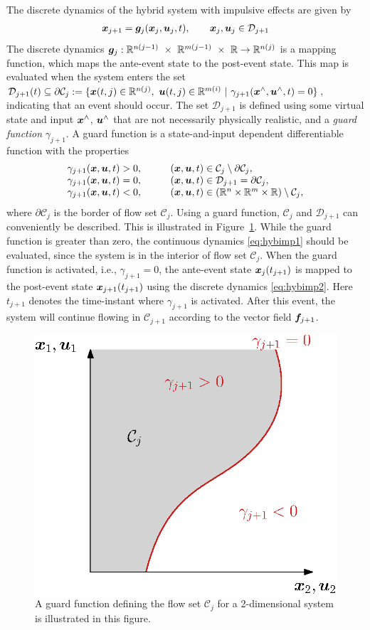 \documentclass[../DC2017114Bouma.tex]{subfiles}
\begin{document}
The discrete dynamics of the hybrid system with impulsive effects are given by
\begin{align}
{\boldsymbol{x}}_{j+1} = {\boldsymbol{g}}_j({\boldsymbol{x}}_j,{\boldsymbol{u}}_j,t), \qquad{\boldsymbol{x}}_j,{\boldsymbol{u}}_j\in \mathcal{D}_{j+1}\label{eq:hybimp2}
\end{align}
The discrete dynamics $\gb_j:\Rbb^{n(j-1)}\ \times\ \Rbb^{m(j-1)}\ \times\ \Rbb\rightarrow \Rbb^{n(j)}$ is a mapping function, which maps the ante-event state to the post-event state. This map is evaluated when the system enters the set $\mathcal{D}_{j+1}(t) \subseteq \partial \mathcal{C}_j := \{\xb(t,j)\in\Rbb^{n(j)},\ \ub(t,j)\in\Rbb^{m(i)}\ |\ \gamma_{j+1}(\xb^{\wedge},\ub^{\wedge},t) = 0\}$, indicating that an event should occur.  The set $\mathcal{D}_{j+1}$ is defined using some virtual state and input ${\boldsymbol{x}}^{\wedge}$, ${\boldsymbol{u}}^{\wedge}$ that are not necessarily physically realistic, and a \textit{guard function} $\gamma_{j+1}$. A guard function is a state-and-input dependent differentiable function with the properties
\begin{equation}
\begin{array}{llll}
\gamma_{j+1}({\boldsymbol{x}},{\boldsymbol{u}},t) > 0, & &	&({\boldsymbol{x}},{\boldsymbol{u}},t) \in \mathcal{C}_j\setminus\partial \mathcal{C}_j,\\
\gamma_{j+1}({\boldsymbol{x}},{\boldsymbol{u}},t) = 0, & &	&({\boldsymbol{x}},{\boldsymbol{u}},t) \in \mathcal{D}_{j+1} = \partial \mathcal{C}_j,\\
\gamma_{j+1}({\boldsymbol{x}},{\boldsymbol{u}},t) < 0, & &	&({\boldsymbol{x}},{\boldsymbol{u}},t) \in (\mathbb{R}^n \times \mathbb{R}^m \times \mathbb{R})\setminus \mathcal{C}_j,
\end{array}
\end{equation}
where $\partial \mathcal{C}_j$ is the border of flow set $\mathcal{C}_j$. Using a guard function, $\mathcal{C}_j$ and $\mathcal{D}_{j+1}$ can conveniently be described. This is illustrated in Figure~\ref{fig:2guards}. While the guard function is greater than zero, the continuous dynamics \eqref{eq:hybimp1} should be evaluated, since the system is in the interior of flow set $\mathcal{C}_j$. When the guard function is activated, i.e., $\gamma_{j+1} = 0$, the ante-event state ${\boldsymbol{x}}_j(t_{j+1})$ is mapped to the post-event state ${\boldsymbol{x}}_{j+1}(t_{j+1})$ using the discrete dynamics \eqref{eq:hybimp2}. Here $t_{j+1}$ denotes the time-instant where $\gamma_{j+1}$ is activated. After this event, the system will continue flowing in $\mathcal{C}_{j+1}$ according to the vector field ${\boldsymbol{f}}_{j+1}$.

\begin{figure}[h]
\centering
\includegraphics[width=.5\textwidth]{guards.eps}\caption{A guard function defining the flow set $\mathcal{C}_j$ for a 2-dimensional system is illustrated in this figure.} \label{fig:2guards}
\end{figure}
\end{document}
